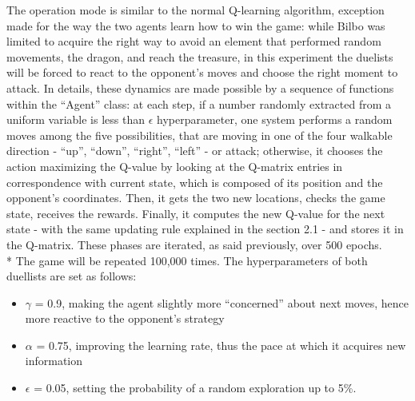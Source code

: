 The operation mode is similar to the normal Q-learning algorithm, exception made for the way the two agents learn how to win the game: while Bilbo was limited to acquire the right way to avoid an element that performed random movements, the dragon, and reach the treasure, in this experiment the duelists will be forced to react to the opponent's moves and choose the right moment to attack. In details, these dynamics are made possible by a sequence of functions within the ``Agent'' class:  at each step, if a number randomly extracted from a uniform variable is less than $\epsilon$ hyperparameter, one system performs a random moves among the five possibilities, that are moving in one of the four walkable direction - ``up'', ``down'', ``right'', ``left'' - or attack; otherwise, it chooses the action maximizing the Q-value by looking at the Q-matrix entries in correspondence with current state, which is composed of its position and the opponent's coordinates. Then, it gets the two new locations, checks the game state, receives the rewards. Finally, it computes the new Q-value for the next state - with the same updating rule explained in the section 2.1 - and stores it in the Q-matrix. These phases are iterated, as said previously, over 500 epochs.\\*
The game will be repeated 100,000 times. The hyperparameters of both duellists are set as follows:
\begin{itemize}[noitemsep, topsep=0ex]
  \item $\gamma$ = 0.9, making the agent slightly more ``concerned'' about next moves, hence more reactive to the opponent's strategy
  \item $\alpha$ = 0.75, improving the learning rate, thus the pace at which it acquires new information
  \item $\epsilon$ = 0.05, setting the probability of a random exploration up to 5\%.
\end{itemize} 
